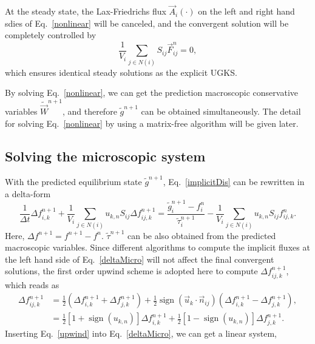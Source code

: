 \documentclass[3p,12pt]{elsarticle}
\begin{document}
	At the steady state, the Lax-Friedrichs flux $\vec{A}_i\left( \cdot \right)$ on the left and right hand sdies of Eq.~\eqref{nonlinear} will be canceled, and the convergent solution will be completely controlled by
	\begin{equation}
		\frac{1}{V_i}\sum_{j\in N(i)}S_{ij}\vec{F}_{ij}^{n} = 0,
	\end{equation}
	which ensures identical steady solutions as the explicit UGKS.
	
	By solving Eq.~\eqref{nonlinear}, we can get the prediction macroscopic conservative variables $\tilde{\vec{W}}^{n+1}$, and therefore $\tilde{g}^{n+1}$ can be obtained simultaneously. The detail for solving Eq.~\eqref{nonlinear} by using a matrix-free algorithm will be given later.
	
	\subsection{Solving the microscopic system}
	With the predicted equilibrium state $\tilde{g}^{n+1}$, Eq.~\eqref{implicitDis} can be rewritten in a delta-form
	\begin{equation}
		\frac{1}{\Delta t} \Delta f^{n+1}_{i,k} + \frac{1}{V_i}\sum_{j\in N(i)} u_{k,n}S_{ij}\Delta f_{ij,k}^{n+1} = \frac{\tilde{g}_{i}^{n+1} - f_{i}^{n}}{\tilde{\tau}_{i}^{n+1}} - \frac{1}{V_i}\sum_{j\in N(i)} u_{k,n}S_{ij} f_{ij,k}^{n}.
		\label{deltaMicro}\end{equation}
	Here, $\Delta f^{n+1} = f^{n+1} - f^{n}$. $\tilde{\tau}^{n+1}$ can be also obtained from the predicted macroscopic variables. Since different algorithms to compute the implicit fluxes at the left hand side of Eq.~\eqref{deltaMicro} will not affect the final convergent solutions, the first order upwind scheme is adopted here to compute $\Delta f_{ij,k}^{n+1}$, which reads as
	\begin{equation}
		\begin{aligned} \Delta f_{i j, k}^{n+1} &=\frac{1}{2}\left(\Delta f_{i, k}^{n+1}+\Delta f_{j, k}^{n+1}\right)+\frac{1}{2} \operatorname{sign}\left(\vec{u}_{k} \cdot \vec{n}_{i j}\right)\left(\Delta f_{i, k}^{n+1}-\Delta f_{j, k}^{n+1}\right), \\ &=\frac{1}{2}\left[1+\operatorname{sign}\left(u_{k, n}\right)\right] \Delta f_{i, k}^{n+1}+\frac{1}{2}\left[1-\operatorname{sign}\left(u_{k, n}\right)\right] \Delta f_{j, k}^{n+1}. \end{aligned}
		\label{upwind}\end{equation}
	Inserting Eq.~\eqref{upwind} into Eq.~\eqref{deltaMicro}, we can get a linear system,
\end{document}
